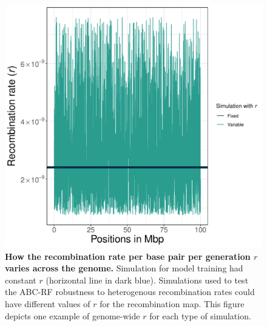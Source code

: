 \documentclass[a4paper, 12pt]{article}
\begin{document}
\begin{figure}[ht]
  \centering
  \includegraphics[width=1\textwidth]{Figures/FigureS4_example_variable_recomb.pdf}
  \small\caption{\textbf{How the recombination rate per base pair per generation $r$ varies across the genome.} Simulation for model training had constant $r$ (horizontal line in dark blue). Simulations used to test the ABC-RF robustness to heterogenous recombination rates could have different values of $r$ for the recombination map. This figure depicts one example of genome-wide $r$ for each type of simulation.}
  \label{fig:supple_example_recomb}
\end{figure}
\end{document}
